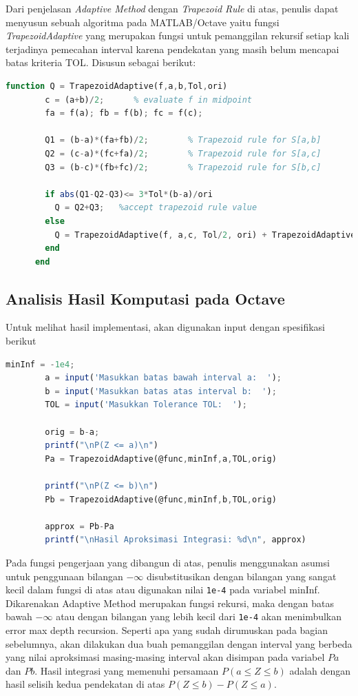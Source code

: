 \documentclass[journal,12pt,onecolumn,a4paper]{IEEEtran}
\begin{document}
Dari penjelasan \emph{Adaptive Method} dengan \emph{Trapezoid Rule} di atas, penulis dapat menyusun sebuah algoritma pada MATLAB/Octave yaitu fungsi \emph{TrapezoidAdaptive} yang merupakan fungsi untuk pemanggilan rekursif setiap kali terjadinya pemecahan interval karena pendekatan yang masih belum mencapai batas kriteria TOL. Disusun sebagai berikut:
\begin{center}
	\begin{lstlisting}[language=Octave]
		function Q = TrapezoidAdaptive(f,a,b,Tol,ori)
		c = (a+b)/2;      % evaluate f in midpoint
		fa = f(a); fb = f(b); fc = f(c);
	  
		Q1 = (b-a)*(fa+fb)/2;        % Trapezoid rule for S[a,b]
		Q2 = (c-a)*(fc+fa)/2;        % Trapezoid rule for S[a,c]
		Q3 = (b-c)*(fb+fc)/2;        % Trapezoid rule for S[b,c]
	  
		if abs(Q1-Q2-Q3)<= 3*Tol*(b-a)/ori
		  Q = Q2+Q3;   %accept trapezoid rule value
		else
		  Q = TrapezoidAdaptive(f, a,c, Tol/2, ori) + TrapezoidAdaptive(f,c,b, Tol/2, ori); % use algorithm for [a,c] and [c,b]
		end
	  end
	\end{lstlisting}
\end{center}

\subsection{Analisis Hasil Komputasi pada Octave}

Untuk melihat hasil implementasi, akan digunakan input dengan spesifikasi berikut

\begin{center}
	\begin{lstlisting}[language=Octave]
		minInf = -1e4;
		a = input('Masukkan batas bawah interval a:  ');
		b = input('Masukkan batas atas interval b:  ');
		TOL = input('Masukkan Tolerance TOL:  ');

		orig = b-a;
		printf("\nP(Z <= a)\n")
		Pa = TrapezoidAdaptive(@func,minInf,a,TOL,orig)

		printf("\nP(Z <= b)\n")
		Pb = TrapezoidAdaptive(@func,minInf,b,TOL,orig)

		approx = Pb-Pa
		printf("\nHasil Aproksimasi Integrasi: %d\n", approx)
	\end{lstlisting}
\end{center}

Pada fungsi pengerjaan yang dibangun di atas, penulis menggunakan asumsi untuk penggunaan bilangan \(-\infty\) disubstitusikan dengan bilangan yang sangat kecil dalam fungsi di atas atau digunakan nilai \lstinline{1e-4} pada variabel minInf. Dikarenakan Adaptive Method merupakan fungsi rekursi, maka dengan batas bawah \(-\infty\) atau dengan bilangan yang lebih kecil dari \lstinline{1e-4} akan menimbulkan error max depth recursion.
Seperti apa yang sudah dirumuskan pada bagian sebelumnya, akan dilakukan dua buah pemanggilan dengan interval yang berbeda yang nilai aproksimasi masing-masing interval akan disimpan pada variabel \(Pa\) dan \(Pb\). Hasil integrasi yang memenuhi persamaan \(P(a \le Z \le b)\) adalah dengan hasil selisih kedua pendekatan di atas \(P(Z \le b ) - P(Z \le a )\).
\end{document}
